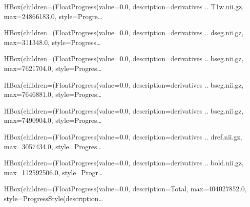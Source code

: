 \documentclass[letterpaper,10pt,english]{sphinxmanual}
\begin{document}
\begin{sphinxVerbatim}[commandchars=\\\{\}]
HBox(children=(FloatProgress(value=0.0, description=\PYGZsq{}derivatives .. \PYGZus{}T1w.nii.gz\PYGZsq{}, max=24866183.0, style=Progre…
\end{sphinxVerbatim}

\begin{sphinxVerbatim}[commandchars=\\\{\}]
HBox(children=(FloatProgress(value=0.0, description=\PYGZsq{}derivatives .. dseg.nii.gz\PYGZsq{}, max=311348.0, style=Progress…
\end{sphinxVerbatim}

\begin{sphinxVerbatim}[commandchars=\\\{\}]
HBox(children=(FloatProgress(value=0.0, description=\PYGZsq{}derivatives .. bseg.nii.gz\PYGZsq{}, max=7621704.0, style=Progres…
\end{sphinxVerbatim}

\begin{sphinxVerbatim}[commandchars=\\\{\}]
HBox(children=(FloatProgress(value=0.0, description=\PYGZsq{}derivatives .. bseg.nii.gz\PYGZsq{}, max=7646881.0, style=Progres…
\end{sphinxVerbatim}

\begin{sphinxVerbatim}[commandchars=\\\{\}]
HBox(children=(FloatProgress(value=0.0, description=\PYGZsq{}derivatives .. bseg.nii.gz\PYGZsq{}, max=7490904.0, style=Progres…
\end{sphinxVerbatim}

\begin{sphinxVerbatim}[commandchars=\\\{\}]
HBox(children=(FloatProgress(value=0.0, description=\PYGZsq{}derivatives .. dref.nii.gz\PYGZsq{}, max=3057434.0, style=Progres…
\end{sphinxVerbatim}

\begin{sphinxVerbatim}[commandchars=\\\{\}]
HBox(children=(FloatProgress(value=0.0, description=\PYGZsq{}derivatives .. bold.nii.gz\PYGZsq{}, max=112592506.0, style=Progr…
\end{sphinxVerbatim}

\begin{sphinxVerbatim}[commandchars=\\\{\}]
HBox(children=(FloatProgress(value=0.0, description=\PYGZsq{}Total\PYGZsq{}, max=404027852.0, style=ProgressStyle(description\PYGZus{}…
\end{sphinxVerbatim}
\end{document}
